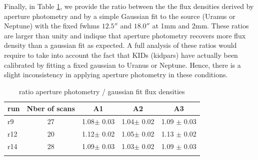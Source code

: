 






Finally, in Table \ref{tab:ratio}, we provide the ratio between the 
the flux densities derived by aperture photometry and by a simple Gaussian fit to the source (Uranus or Neptune) with the fixed fwhms $12.5''$ and $18.0''$
at 1mm and 2mm.
These ratios are larger than unity and indique that aperture photometry recovers more flux density than  a gaussian fit as expected. A  full analysis
of these ratios would require to take into account the fact that KIDs (kidpars) have actually been calibrated by fitting a fixed gaussian to Uranus 
or Neptune. Hence, there is a slight inconsistency in applying aperture photometry in these conditions.    






\begin{table}[!h]
\caption{ratio aperture photometry / gaussian fit flux densities   }
\label{tab:ratio}
\centering
\begin{tabular}{l| c | c c c }
\hline\hline
\noalign{\smallskip}
run     & Nber of scans  &  A1    &    A2   &  A3    \\
\hline
r9    & 27  &  1.08$\pm$ 0.03    &  1.04$\pm$ 0.02 & 1.09 $\pm$ 0.03     \\
r12   & 20  &  1.12$\pm$ 0.02    &  1.05$\pm$ 0.02 & 1.13 $\pm$ 0.02     \\
r14   & 28  &  1.09$\pm$ 0.03    &  1.03$\pm$ 0.02 & 1.09 $\pm$ 0.03     \\
\noalign{\smallskip}
\hline
\end{tabular}
\end{table}
